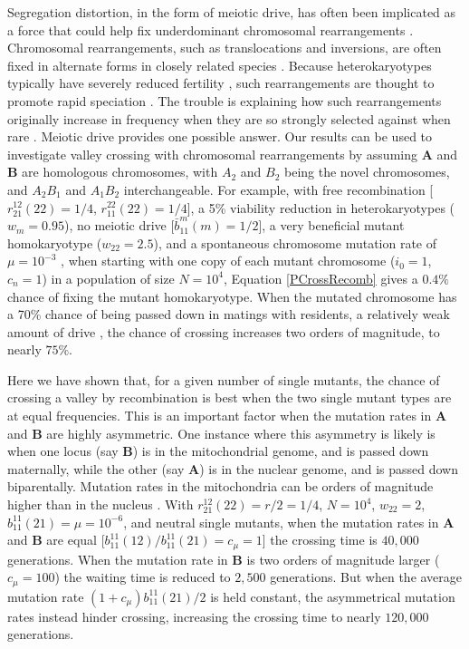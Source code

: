 \documentclass[review,3p,authoryear]{elsarticle}
\begin{document}
Segregation distortion, in the form of meiotic drive, has often been implicated as a force that could help fix underdominant chromosomal rearrangements \citep{Sandler1957,Bengtsson1976,Hedrick1981,Walsh1982,Faria2010}.
Chromosomal rearrangements, such as translocations and inversions, are often fixed in alternate forms in closely related species \citep{White1978,Coyne1989,Faria2010}.
Because heterokaryotypes typically have severely reduced fertility \citep{Sandler1957,Lande1979}, such rearrangements are thought to promote rapid speciation \citep[stasipatric speciation;][but see \citealp{Faria2010,Kirkpatrick2010}]{White1978}.
The trouble is explaining how such rearrangements originally increase in frequency when they are so strongly selected against when rare \citep{Navarro2003,Kirkpatrick2010}. 
Meiotic drive provides one possible answer.
Our results can be used to investigate valley crossing with chromosomal rearrangements by assuming $\mathbf{A}$ and $\mathbf{B}$ are homologous chromosomes, with $A_2$ and $B_2$ being the novel chromosomes, and $A_2B_1$ and $A_1B_2$ interchangeable. 
For example, with free recombination [$r_{21}^{12}(22)=1/4$, $r_{11}^{22}(22)=1/4$], a 5\% viability reduction in heterokaryotypes ($w_{m}=0.95$), no meiotic drive [$\bar{b}_{11}^{m}(m)=1/2$], a very beneficial mutant homokaryotype ($w_{22}=2.5$), and a spontaneous chromosome mutation rate of $\mu=10^{-3}$ \citep{Lande1979}, when starting with one copy of each mutant chromosome ($i_0 = 1$, $c_n=1$) in a population of size $N=10^4$, Equation \eqref{PCrossRecomb} gives a $0.4\%$ chance of fixing the mutant homokaryotype.
When the mutated chromosome has a 70\% chance of being passed down in matings with residents, a relatively weak amount of drive \citep{Sandler1957}, the chance of crossing increases two orders of magnitude, to nearly $75\%$. 

Here we have shown that, for a given number of single mutants, the chance of crossing a valley by recombination is best when the two single mutant types are at equal frequencies.
This is an important factor when the mutation rates in $\mathbf{A}$ and $\mathbf{B}$ are highly asymmetric.
One instance where this asymmetry is likely is when one locus (say $\mathbf{B}$) is in the mitochondrial genome, and is passed down maternally, while the other (say $\mathbf{A}$) is in the nuclear genome, and is passed down biparentally.
Mutation rates in the mitochondria can be orders of magnitude higher than in the nucleus \citep{Linnane1989}.
With $r_{21}^{12}(22)=r/2=1/4$, $N=10^4$, $w_{22}=2$, $b_{11}^{11}(21)=\mu=10^{-6}$, and neutral single mutants, when the mutation rates in $\mathbf{A}$ and $\mathbf{B}$ are equal [$b_{11}^{11}(12)/b_{11}^{11}(21)=c_\mu=1$] the crossing time is $40,000$ generations.
When the mutation rate in $\mathbf{B}$ is two orders of magnitude larger ($c_\mu=100$) the waiting time is reduced to $2,500$ generations.
But when the average mutation rate $(1+c_\mu)b_{11}^{11}(21)/2$ is held constant, the asymmetrical mutation rates instead hinder crossing, increasing the crossing time to nearly $120,000$ generations.
\end{document}
